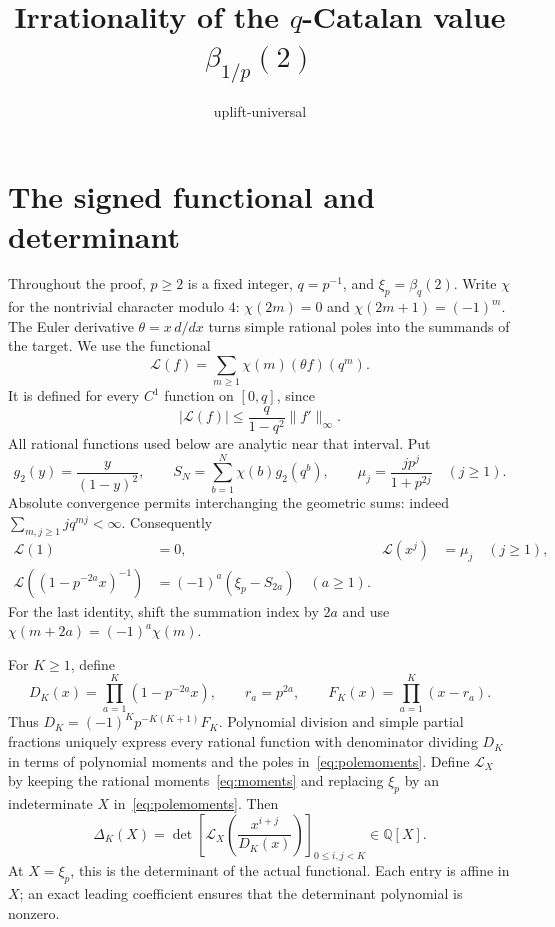 \documentclass[11pt,letterpaper]{article}
\title{Irrationality of the $q$-Catalan value $\beta_{1/p}(2)$}
\author{uplift-universal}
\date{}
\numberwithin{equation}{section}
\theoremstyle{remark}\newtheorem{remark}[theorem]{Remark}
\newcommand{\Q}{\mathbb Q}\newcommand{\Z}{\mathbb Z}\newcommand{\C}{\mathbb C}
\newcommand{\Lcal}{\mathcal L}\newcommand{\Fcal}{\mathcal F}
\begin{document}
\maketitle

\section{The signed functional and determinant}
Throughout the proof, $p\ge2$ is a fixed integer, $q=p^{-1}$, and $\xi_p=\beta_q(2)$. Write $\chi$ for the nontrivial character modulo $4$: $\chi(2m)=0$ and $\chi(2m+1)=(-1)^m$. The Euler derivative $\theta=x\,d/dx$ turns simple rational poles into the summands of the target. We use the functional
\begin{equation}\label{eq:functional}
 \Lcal(f)=\sum_{m\ge1}\chi(m)(\theta f)(q^m).
\end{equation}
It is defined for every $C^1$ function on $[0,q]$, since
\begin{equation}\label{eq:continuity}
 |\Lcal(f)|\le\frac{q}{1-q^2}\|f'\|_\infty.
\end{equation}
All rational functions used below are analytic near that interval. Put
\begin{equation}\label{eq:tails}
 g_2(y)=\frac{y}{(1-y)^2},\qquad
 S_N=\sum_{b=1}^N\chi(b)g_2(q^b),\qquad
 \mu_j=\frac{jp^j}{1+p^{2j}}\quad(j\ge1).
\end{equation}
Absolute convergence permits interchanging the geometric sums: indeed $\sum_{m,j\ge1}j q^{mj}<\infty$. Consequently
\begin{align}\label{eq:moments}
 \Lcal(1)&=0,&\Lcal(x^j)&=\mu_j\quad(j\ge1),\\
 \Lcal((1-p^{-2a}x)^{-1})&=(-1)^a(\xi_p-S_{2a})\quad(a\ge1).\label{eq:polemoments}
\end{align}
For the last identity, shift the summation index by $2a$ and use $\chi(m+2a)=(-1)^a\chi(m)$.

For $K\ge1$, define
\begin{equation}\label{eq:D}
 D_K(x)=\prod_{a=1}^K(1-p^{-2a}x),\qquad r_a=p^{2a},\qquad
 F_K(x)=\prod_{a=1}^K(x-r_a).
\end{equation}
Thus $D_K=(-1)^Kp^{-K(K+1)}F_K$. Polynomial division and simple partial fractions uniquely express every rational function with denominator dividing $D_K$ in terms of polynomial moments and the poles in~\eqref{eq:polemoments}. Define $\Lcal_X$ by keeping the rational moments~\eqref{eq:moments} and replacing $\xi_p$ by an indeterminate $X$ in~\eqref{eq:polemoments}. Then
\begin{equation}\label{eq:Delta}
 \Delta_K(X)=\det\left[\Lcal_X\left(\frac{x^{i+j}}{D_K(x)}\right)\right]_{0\le i,j<K}
 \in\Q[X].
\end{equation}
At $X=\xi_p$, this is the determinant of the actual functional. Each entry is affine in $X$; an exact leading coefficient ensures that the determinant polynomial is nonzero.
\end{document}
